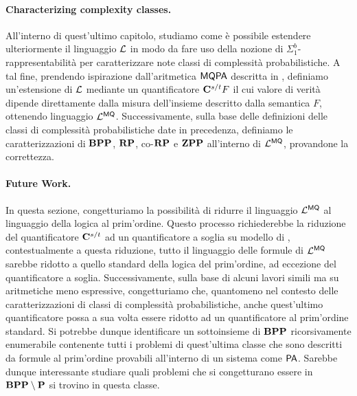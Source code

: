 \documentclass{article}
\begin{document}
\paragraph*{Characterizing complexity classes.} All'interno di quest'ultimo capitolo,
studiamo come è possibile estendere ulteriormente il linguaggio $\mathcal{L}$ in modo da fare
uso della nozione di $\Sigma^b_1$-rappresentabilità per caratterizzare note classi di
complessità probabilistiche. A tal fine, prendendo ispirazione dall'aritmetica $\mathsf{MQPA}$
descritta in \cite{ADLP, ADLP21}, definiamo un'estensione di $\mathcal{L}$ mediante un
quantificatore $\mathbf{C}^{s/t}F$ il cui valore di verità dipende direttamente dalla misura
dell'insieme descritto dalla semantica $F$, ottenendo linguaggio $\mathcal{L}^{\mathsf{MQ}}$.
Successivamente, sulla base delle definizioni delle classi di complessità
probabilistiche date in precedenza, definiamo le caratterizzazioni di $\mathbf{BPP}$,
$\mathbf{RP}$, co-$\mathbf{RP}$ e $\mathbf{ZPP}$ all'interno di $\mathcal{L}^{\mathsf{MQ}}$, provandone la correttezza.

\paragraph*{Future Work.} In questa sezione, congetturiamo la possibilità di ridurre
il linguaggio $\mathcal{L}^{\mathsf{MQ}}$ al linguaggio della logica al prim'ordine. Questo processo
richiederebbe la riduzione del quantificatore $\mathbf{C}^{s/t}$ ad un quantificatore a
soglia su modello di \cite{Gradel}, contestualmente a questa riduzione, tutto il linguaggio delle formule di $\mathcal{L}^{\mathsf{MQ}}$ sarebbe ridotto a quello standard della logica del
prim'ordine, ad eccezione del quantificatore a soglia. Successivamente,
sulla base di alcuni lavori simili \cite{Schweikardt, Chistikov2021PresburgerAW} ma su aritmetiche meno espressive,
congetturiamo che, quantomeno nel contesto delle caratterizzazioni
di classi di complessità probabilistiche, anche quest'ultimo quantificatore
possa a sua volta essere ridotto ad un quantificatore al prim'ordine standard.
Si potrebbe dunque identificare un sottoinsieme di $\mathbf{BPP}$ ricorsivamente
enumerabile contenente tutti i problemi di quest'ultima classe che sono
descritti da formule al prim'ordine provabili all'interno di un sistema come $\mathsf{PA}$.
Sarebbe dunque interessante studiare quali problemi che si congetturano essere
in $\mathbf{BPP} \setminus \mathbf P$ si trovino in questa classe.

\newpage
\printbibliography
\end{document}
